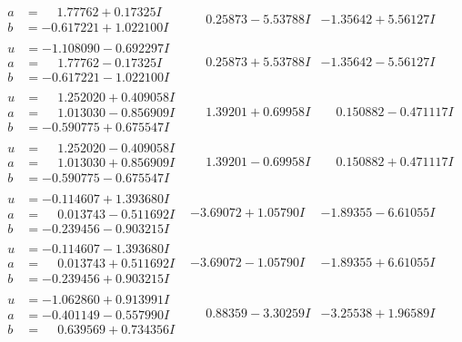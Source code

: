 \documentclass[1p]{elsarticle_modified}
\theoremstyle{definition}
\begin{document}
$$\begin{array}{c|c|c}
\begin{aligned}
a &= \phantom{-}1.77762 + 0.17325 I \\
b &= -0.617221 + 1.022100 I\end{aligned}
 & \phantom{-}0.25873 - 5.53788 I & -1.35642 + 5.56127 I \\ \hline\begin{aligned}
u &= -1.108090 - 0.692297 I \\
a &= \phantom{-}1.77762 - 0.17325 I \\
b &= -0.617221 - 1.022100 I\end{aligned}
 & \phantom{-}0.25873 + 5.53788 I & -1.35642 - 5.56127 I \\ \hline\begin{aligned}
u &= \phantom{-}1.252020 + 0.409058 I \\
a &= \phantom{-}1.013030 - 0.856909 I \\
b &= -0.590775 + 0.675547 I\end{aligned}
 & \phantom{-}1.39201 + 0.69958 I & \phantom{-}0.150882 - 0.471117 I \\ \hline\begin{aligned}
u &= \phantom{-}1.252020 - 0.409058 I \\
a &= \phantom{-}1.013030 + 0.856909 I \\
b &= -0.590775 - 0.675547 I\end{aligned}
 & \phantom{-}1.39201 - 0.69958 I & \phantom{-}0.150882 + 0.471117 I \\ \hline\begin{aligned}
u &= -0.114607 + 1.393680 I \\
a &= \phantom{-}0.013743 - 0.511692 I \\
b &= -0.239456 - 0.903215 I\end{aligned}
 & -3.69072 + 1.05790 I & -1.89355 - 6.61055 I \\ \hline\begin{aligned}
u &= -0.114607 - 1.393680 I \\
a &= \phantom{-}0.013743 + 0.511692 I \\
b &= -0.239456 + 0.903215 I\end{aligned}
 & -3.69072 - 1.05790 I & -1.89355 + 6.61055 I \\ \hline\begin{aligned}
u &= -1.062860 + 0.913991 I \\
a &= -0.401149 - 0.557990 I \\
b &= \phantom{-}0.639569 + 0.734356 I\end{aligned}
 & \phantom{-}0.88359 - 3.30259 I & -3.25538 + 1.96589 I \\ \hline\begin{aligned}

\end{aligned}
\end{array}$$
\end{document}
